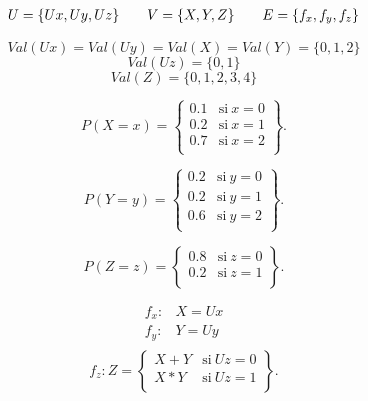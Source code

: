 \begin{model}
	\label{model:sum}
	\[
	\arraycolsep=10pt
	\begin{array}{ccc}
		U = \{Ux, Uy, Uz\}&
		V = \{X, Y, Z\}&
		E = \{f_x, f_y, f_z\}
	\end{array}
	\]
	
	\[Val(Ux)=Val(Uy)=Val(X)=Val(Y)=\{0,1,2\}\]
	\[Val(Uz)=\{0, 1\}\]
	\[Val(Z)=\{0, 1, 2, 3, 4\}\]
	
	\begin{equation*}
		P(X=x)=  
		\left\{
		\begin{array}{ll}
			0.1 & \mathrm{si\ } x = 0\\
			0.2 & \mathrm{si\ } x = 1\\
			0.7 & \mathrm{si\ } x = 2\\
		\end{array}
		\right\}.
	\end{equation*}
	
	\begin{equation*}
		P(Y=y)=  
		\left\{
		\begin{array}{ll}
			0.2 & \mathrm{si\ } y = 0\\
			0.2 & \mathrm{si\ } y = 1\\
			0.6 & \mathrm{si\ } y = 2\\
		\end{array}
		\right\}.
	\end{equation*}
	
	\begin{equation*}
		P(Z=z)=  
		\left\{
		\begin{array}{ll}
			0.8 & \mathrm{si\ } z = 0\\
			0.2 & \mathrm{si\ } z = 1\\
		\end{array}
		\right\}.
	\end{equation*}
	
	\begin{center}
		\[
		\begin{array}{cc}
			f_x: & X = Ux\\
			f_y: & Y = Uy\\	
		\end{array}
		\]			
		\begin{equation*}
			f_z: Z=  
			\left\{
			\begin{array}{ll}
				X + Y & \mathrm{si\ } Uz = 0\\
				X * Y & \mathrm{si\ } Uz = 1\\
			\end{array}
			\right\}.
		\end{equation*}
	\end{center}
\end{model}

